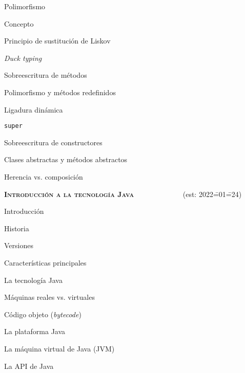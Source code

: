 \begin{longenum}
\begin{longenum}
\begin{longenum}
        \end{longenum}
        \item Polimorfismo
        \begin{longenum}
            \item Concepto
            \item Principio de sustitución de Liskov
            \item \textit{Duck typing}
            \item Sobreescritura de métodos
            \begin{longenum}
                \item Polimorfismo y métodos redefinidos
            \end{longenum}
            \item Ligadura dinámica
            \item \texttt{super}
            \item Sobreescritura de constructores
            \item Clases abstractas y métodos abstractos
        \end{longenum}
        \item Herencia vs. composición
    \end{longenum}
    \item \textbf{\textsc{Introducción a la tecnología Java}} \ \ \ \ \ \ \ \ \ \ \ \ \ (est: 2022\==01\==24)
    \begin{longenum}
        \item Introducción
        \begin{longenum}
            \item Historia
            \item Versiones
            \item Características principales
        \end{longenum}
        \item La tecnología Java
        \begin{longenum}
            \item Máquinas reales vs. virtuales
            \item Código objeto (\textit{bytecode})
            \item La plataforma Java
            \begin{longenum}
                \item La máquina virtual de Java (JVM)
                \item La API de Java

\end{longenum}
\end{longenum}
\end{longenum}
\end{longenum}
